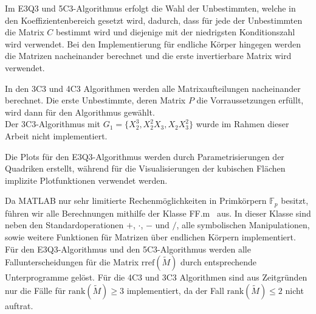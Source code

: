 \documentclass[a4paper,oneside, 11pt, openany%
]{article}
\newcommand{\F}[1]{\mathbb{F}_{#1}}
\theoremstyle{custom}
\theoremstyle{custom}
\begin{document}
	Im E3Q3 und 5C3-Algorithmus erfolgt die Wahl der Unbestimmten, welche in den Koeffizientenbereich gesetzt wird, dadurch, dass für jede der Unbestimmten die Matrix $C$ bestimmt wird und diejenige mit der niedrigsten Konditionszahl wird verwendet. Bei den Implementierung für endliche Körper hingegen werden die Matrizen nacheinander berechnet und die erste invertierbare Matrix wird verwendet.
	
	In den 3C3 und 4C3 Algorithmen werden alle Matrixaufteilungen nacheinander berechnet. Die erste Unbestimmte, deren Matrix $P$ die Vorraussetzungen erfüllt, wird dann für den Algorithmus gewählt.\\
	Der 3C3-Algorithmus mit $G_1=\{X_2^3,X_2^2X_3,X_2X_3^2\}$ wurde im Rahmen dieser Arbeit nicht implementiert.
	
	Die Plots für den E3Q3-Algorithmus werden durch Parametrisierungen der Quadriken erstellt, während für die  Visualisierungen der kubischen Flächen implizite Plotfunktionen verwendet werden.
	
	Da MATLAB nur sehr limitierte Rechenmöglichkeiten in Primkörpern $\F{p}$ besitzt, führen wir alle Berechnungen mithilfe der Klasse \glqq FF.m\grqq~ aus. In dieser Klasse sind neben den Standardoperationen $+$, $\cdot$, $-$ und $/$, alle symbolischen Manipulationen, sowie weitere Funktionen für Matrizen über endlichen Körpern implementiert.\\
	Für den E3Q3-Algorithmus und den 5C3-Algorithmus werden alle Fallunterscheidungen für die Matrix $\text{rref}(\tilde{M})$ durch entsprechende Unterprogramme gelöst. Für die 4C3 und 3C3 Algorithmen sind aus Zeitgründen nur die Fälle für $\text{rank}(\tilde{M}) \geq 3$ implementiert, da der Fall $\text{rank}(\tilde{M}) \leq 2$ nicht auftrat.
	\newpage
\end{document}
